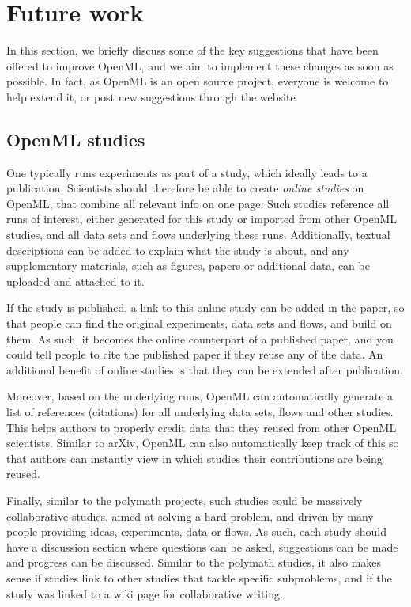 \documentclass{acmproc-sp}
\begin{document}
\section{Future work}
\label{future}
In this section, we briefly discuss some of the key suggestions that have been offered to improve OpenML, and we aim to implement these changes as soon as possible. In fact, as OpenML is an open source project, everyone is welcome to help extend it, or post new suggestions through the website.\\

\subsection{OpenML studies}
One typically runs experiments as part of a study, which ideally leads to a publication. Scientists should therefore be able to create \textit{online studies} on OpenML, that combine all relevant info on one page. Such studies reference all runs of interest, either generated for this study or imported from other OpenML studies, and all data sets and flows underlying these runs. Additionally, textual descriptions can be added to explain what the study is about, and any supplementary materials, such as figures, papers or additional data, can be uploaded and attached to it. 

If the study is published, a link to this online study can be added in the paper, so that people can find the original experiments, data sets and flows, and build on them. As such, it becomes the online counterpart of a published paper, and you could tell people to cite the published paper if they reuse any of the data. An additional benefit of online studies is that they can be extended after publication. 

Moreover, based on the underlying runs, OpenML can automatically generate a list of references (citations) for all underlying data sets, flows and other studies. This helps authors to properly credit data that they reused from other OpenML scientists. Similar to arXiv, OpenML can also automatically keep track of this so that authors can instantly view in which studies their contributions are being reused.

Finally, similar to the polymath projects, such studies could be massively collaborative studies, aimed at solving a hard problem, and driven by many people providing ideas, experiments, data or flows. As such, each study should have a discussion section where questions can be asked, suggestions can be made and progress can be discussed. Similar to the polymath studies, it also makes sense if studies link to other studies that tackle specific subproblems, and if the study was linked to a wiki page for collaborative writing.
\end{document}
